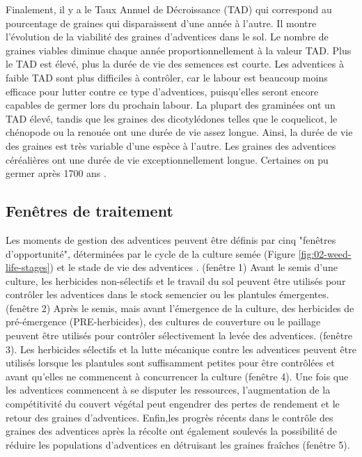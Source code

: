 \documentclass[../thesis.tex]{subfiles}
\begin{document}
    \par Finalement, il y a le Taux Annuel de Décroissance (TAD) qui correspond au pourcentage de graines qui disparaissent d'une année à l'autre. Il montre l'évolution de la viabilité des graines d'adventices dans le sol. Le nombre de graines viables diminue chaque année proportionnellement à la valeur TAD. Plus le TAD est élevé, plus la durée de vie des semences est courte. Les adventices à faible TAD sont plus difficiles à contrôler, car le labour est beaucoup moins efficace pour lutter contre ce type d'adventices, puisqu'elles seront encore capables de germer lors du prochain labour. La plupart des graminées ont un TAD élevé, tandis que les graines des dicotylédones telles que le coquelicot, le chénopode ou la renouée ont une durée de vie assez longue. Ainsi, la durée de vie des graines est très variable d'une espèce à l'autre. Les graines des adventices céréalières ont une durée de vie exceptionnellement longue. Certaines on pu germer après 1700 ans \cite{wesson1967light}.
    
    
    
    \newpage
    \subsection{Fenêtres de traitement}
    
    Les moments de gestion des adventices peuvent être définis par cinq "fenêtres d'opportunité", déterminées par le cycle de la culture semée (Figure \ref{fig:02-weed-life-stages}) et le stade de vie des adventices \cite{agronomy11040747}. (fenêtre 1) Avant le semis d'une culture, les herbicides non-sélectifs et le travail du sol peuvent être utilisés pour contrôler les adventices dans le stock semencier ou les plantules émergentes. (fenêtre 2) Après le semis, mais avant l'émergence de la culture, des herbicides de pré-émergence (PRE-herbicides), des cultures de couverture ou le paillage peuvent être utilisés pour contrôler sélectivement la levée des adventices. (fenêtre 3). Les herbicides sélectifs et la lutte mécanique contre les adventices peuvent être utilisés lorsque les plantules sont suffisamment petites pour être contrôlées et avant qu'elles ne commencent à concurrencer la culture (fenêtre 4). Une fois que les adventices commencent à se disputer les ressources, l'augmentation de la compétitivité du couvert végétal peut engendrer des pertes de rendement et le retour des graines d'adventices. Enfin,les progrès récents dans le contrôle des graines des adventices après la récolte ont également soulevés la possibilité de réduire les populations d'adventices en détruisant les graines fraîches (fenêtre 5).
    
\end{document}
